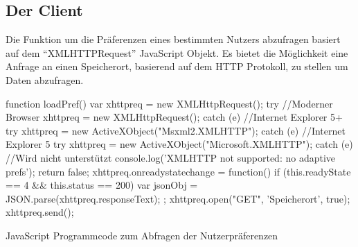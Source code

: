 \documentclass[12pt, paper=a4, bibtotoc, toc=listof, headsepline=true]{scrreprt}
\begin{document}
\subsection{Der Client}
Die Funktion um die Präferenzen eines bestimmten Nutzers abzufragen basiert auf dem \enquote{XMLHTTPRequest} JavaScript Objekt. Es bietet die Möglichkeit eine Anfrage an einen Speicherort, basierend auf dem \ac{HTTP} Protokoll, zu stellen um Daten abzufragen.
\newline
\begin{listing}
	\begin{JavaScriptcode*}{}
function loadPref() {
   var xhttpreq = new XMLHttpRequest();
   try{
      //Moderner Browser
      xhttpreq = new XMLHttpRequest();
   }catch (e){
      //Internet Explorer 5+
      try{
         xhttpreq = new ActiveXObject("Msxml2.XMLHTTP");
      }catch (e) {
         //Internet Explorer 5
         try{
            xhttpreq = new ActiveXObject("Microsoft.XMLHTTP");
         }catch (e){
             //Wird nicht unterstützt
             console.log('XMLHTTP not supported: no adaptive prefs');
             return false;
         }
      }
   }
   xhttpreq.onreadystatechange = function() {
      if (this.readyState == 4 && this.status == 200) {
         var jsonObj = JSON.parse(xhttpreq.responseText);
      }
   };
   xhttpreq.open("GET", 'Speicherort', true);
   xhttpreq.send(); 	
}
	\end{JavaScriptcode*}
	\caption[Abfragen der Nutzerpräferenzen]{JavaScript Programmcode zum Abfragen der Nutzerpräferenzen}
	\label{lst:jquAja}
\end{listing}
\end{document}
